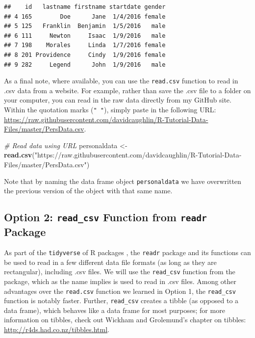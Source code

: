 \documentclass[]{book}
\newenvironment{Shaded}{\begin{snugshade}}{\end{snugshade}}
\newcommand{\KeywordTok}[1]{\textcolor[rgb]{0.13,0.29,0.53}{\textbf{#1}}}
\newcommand{\StringTok}[1]{\textcolor[rgb]{0.31,0.60,0.02}{#1}}
\newcommand{\CommentTok}[1]{\textcolor[rgb]{0.56,0.35,0.01}{\textit{#1}}}
\newcommand{\NormalTok}[1]{#1}
\begin{document}
\begin{verbatim}
##    id   lastname firstname startdate gender
## 4 165        Doe      Jane  1/4/2016 female
## 5 125   Franklin  Benjamin  1/5/2016   male
## 6 111     Newton     Isaac  1/9/2016   male
## 7 198    Morales     Linda  1/7/2016 female
## 8 201 Providence     Cindy  1/9/2016 female
## 9 282     Legend      John  1/9/2016   male
\end{verbatim}

As a final note, where available, you can use the \texttt{read.csv}
function to read in .csv data from a website. For example, rather than
save the .csv file to a folder on your computer, you can read in the raw
data directly from my GitHub site. Within the quotation marks
(\texttt{"\ "}), simply paste in the following URL:
\url{https://raw.githubusercontent.com/davidcaughlin/R-Tutorial-Data-Files/master/PersData.csv}.

\begin{Shaded}
\begin{Highlighting}[]
\CommentTok{# Read data using URL}
\NormalTok{personaldata <-}\StringTok{ }\KeywordTok{read.csv}\NormalTok{(}\StringTok{"https://raw.githubusercontent.com/davidcaughlin/R-Tutorial-Data-Files/master/PersData.csv"}\NormalTok{)}
\end{Highlighting}
\end{Shaded}

Note that by naming the data frame object \texttt{personaldata} we have
overwritten the previous version of the object with that same name.

\subsection{\texorpdfstring{Option 2: \texttt{read\_csv} Function from
\texttt{readr}
Package}{Option 2: read\_csv Function from readr Package}}\label{option-2-read_csv-function-from-readr-package}

As part of the \texttt{tidyverse} of R packages
\citep{R-tidyverse, tidyverse2019}, the \texttt{readr} package
\citep{R-readr} and its functions can be used to read in a few different
data file formats (as long as they are rectangular), including .csv
files. We will use the \texttt{read\_csv} function from the package,
which as the name implies is used to read in .csv files. Among other
advantages over the \texttt{read.csv} function we learned in Option 1,
the \texttt{read\_csv} function is notably faster. Further,
\texttt{read\_csv} creates a tibble (as opposed to a data frame), which
behaves like a data frame for most purposes; for more information on
tibbles, check out Wickham and Grolemund's \citeyearpar{wickham2017}
chapter on tibbles: \url{http://r4ds.had.co.nz/tibbles.html}.
\end{document}
